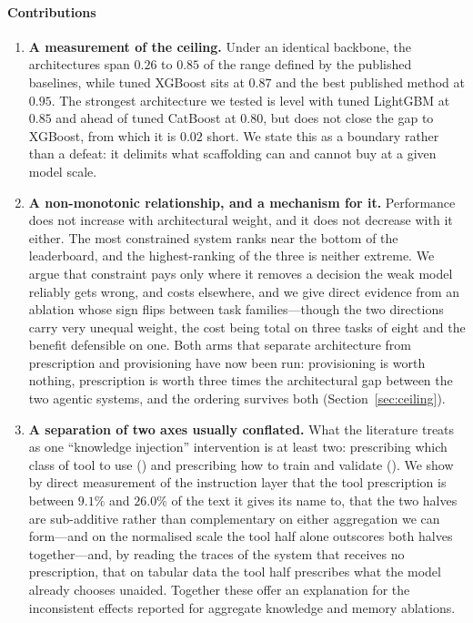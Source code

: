 \paragraph{Contributions}
\begin{enumerate}
  \item \textbf{A measurement of the ceiling.} Under an identical backbone, the
        architectures span $0.26$ to $0.85$ of the range defined by the published
        baselines, while tuned XGBoost sits at $0.87$ and the best published
        method at $0.95$. The strongest architecture we tested is level with
        tuned LightGBM at $0.85$ and ahead of tuned CatBoost at $0.80$, but does
        not close the gap to XGBoost, from which it is $0.02$ short. We state this as a boundary rather than a defeat: it
        delimits what scaffolding can and cannot buy at a given model scale.
  \item \textbf{A non-monotonic relationship, and a mechanism for it.}
        Performance does not increase with architectural weight, and it does not
        decrease with it either. The most constrained system ranks near the
        bottom of the leaderboard, and the highest-ranking of the three is
        neither extreme. We argue that constraint pays only where it removes a
        decision the weak model reliably gets wrong, and costs elsewhere, and we
        give direct evidence from an ablation whose sign flips between task
        families---though the two directions carry very unequal weight, the
        cost being total on three tasks of eight and the benefit defensible on
        one. Both arms that separate architecture from
        prescription and provisioning have now been run: provisioning is worth
        nothing, prescription is worth three times the architectural gap between
        the two agentic systems, and the ordering survives both
        (Section~\ref{sec:ceiling}).
  \item \textbf{A separation of two axes usually conflated.} What the literature
        treats as one ``knowledge injection'' intervention is at least two:
        prescribing which class of tool to use (\Ktool) and prescribing how to
        train and validate (\Kdisc). We show by direct measurement of the
        instruction layer that the tool prescription is between $9.1\%$ and
        $26.0\%$ of the text it gives its name to, that the two halves are
        sub-additive rather than complementary on either aggregation we can
        form---and on the normalised scale the tool half alone outscores both
        halves together---and, by reading the traces of the
        system that receives no prescription, that on tabular data the tool
        half prescribes what the model already chooses unaided. Together these
        offer an explanation for the inconsistent effects reported for aggregate
        knowledge and memory ablations.
\end{enumerate}

